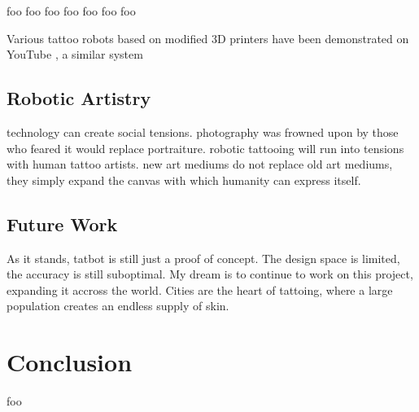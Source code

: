 \documentclass[11pt]{article}
\begin{document}
foo \cite{NietoBastida2023}
foo \cite{arar2025swiftsketch}
foo \cite{carlier2020deepsvg}
foo \cite{mellor2020unsupervised}
foo \cite{ha2017neural}
foo \cite{huang2019learning}
foo \cite{kotani2019teaching}

Various tattoo robots based on modified 3D printers have been demonstrated on YouTube \cite{EmilyTheEngineer2025}, a similar system \cite{YamanDeif2021}

\subsection{Robotic Artistry}

technology can create social tensions.
photography was frowned upon by those who feared it would replace portraiture.
robotic tattooing will run into tensions with human tattoo artists.
new art mediums do not replace old art mediums, they simply expand the canvas with which humanity can express itself.

\subsection{Future Work}

As it stands, tatbot is still just a proof of concept.
The design space is limited, the accuracy is still suboptimal.
My dream is to continue to work on this project, expanding it accross the world.
Cities are the heart of tattoing, where a large population creates an endless supply of skin.

\section{Conclusion}

foo



\end{document}
